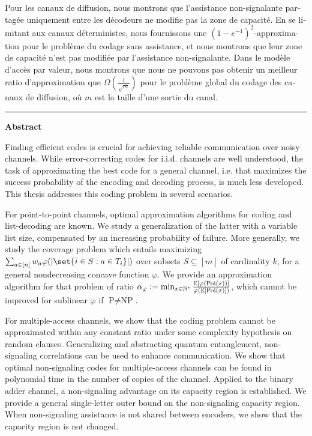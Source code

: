 \begin{otherlanguage}{french}
  Pour les canaux de diffusion, nous montrons que l'assistance non-signalante partagée uniquement entre les décodeurs ne modifie pas la zone de capacité. En se limitant aux canaux déterministes, nous fournissons une $(1-e^{-1})^2$-approximation pour le problème du codage sans assistance, et nous montrons que leur zone de capacité n'est pas modifiée par l'assistance non-signalante. Dans le modèle d'accès par valeur, nous montrons que nous ne pouvons pas obtenir un meilleur ratio d'approximation que $\Omega\left(\frac{1}{\sqrt{m}}\right)$ pour le problème global du codage des canaux de diffusion, où $m$ est la taille d'une sortie du canal.
\end{otherlanguage}
\clearpage 

\flushright
\bigskip
\hrule \bigskip \bigskip
{\Huge \textbf{\textsf{Abstract}}}
\flushleftright
{}
\vspace{1.5cm}

Finding efficient codes is crucial for achieving reliable communication over noisy channels. While error-correcting codes for i.i.d. channels are well understood, the task of approximating the best code for a general channel, i.e. that maximizes the success probability of the encoding and decoding process, is much less developed. This thesis addresses this coding problem in several scenarios.

For point-to-point channels, optimal approximation algorithms for coding and list-decoding are known. We study a generalization of the latter with a variable list size, compensated by an increasing probability of failure. More generally, we study the coverage problem which entails maximizing $\sum_{a \in [n]} w_a \varphi(\abs{\set{i \in S : a \in T_i}})$ over subsets $S \subseteq [m]$ of cardinality $k$, for a general nondecreasing concave function $\varphi$. We provide an approximation algorithm for that problem of ratio $\alpha_{\varphi} := \min_{x \in \mathbb{N}^*} \frac{\mathbb{E}[\varphi(\operatorname{\text{Poi}}(x))]}{\varphi(\mathbb{E}[\operatorname{\text{Poi}}(x)])}$, which cannot be improved for sublinear $\varphi$ if $\textrm{P}\not=\textrm{NP}$.

For multiple-access channels, we show that the coding problem cannot be approximated within any constant ratio under some complexity hypothesis on random clauses. Generalizing and abstracting quantum entanglement, non-signaling correlations can be used to enhance communication. We show that optimal non-signaling codes for multiple-access channels can be found in polynomial time in the number of copies of the channel. Applied to the binary adder channel, a non-signaling advantage on its capacity region is established. We provide a general single-letter outer bound on the non-signaling capacity region. When non-signaling assistance is not shared between encoders, we show that the capacity region is not changed.

